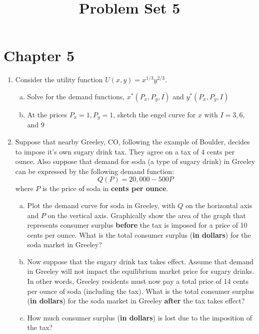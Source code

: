 \documentclass[11pt]{article}
\title{Problem Set 5}
\begin{document}
  
\section*{Chapter 5}

\begin{enumerate}
  \item Consider the utility function $U(x,y) = x^{1/3} y^{2/3}$. 
  
  \begin{enumerate}[(a)]
    \item Solve for the demand functions, $x^*(P_x, P_y, I)$ and $y^*(P_x, P_y, I)$
    


    \item At the prices $P_x = 1, P_y = 1$, sketch the engel curve for $x$ with $I = 3, 6,$ and $9$
    
  \end{enumerate}
  
  \newpage 
  \item Suppose that nearby Greeley, CO, following the example of Boulder, decides to impose it's own sugary drink tax. They agree on a tax of 4 cents per ounce. Also suppose that demand for soda (a type of sugary drink) in Greeley can be expressed by the following demand function:
  $$
    Q(P) = 20,000 - 500P
  $$
  where $P$ is the price of soda in \textbf{cents per ounce}.

  \begin{enumerate}[(a)]
    \item Plot the demand curve for soda in Greeley, with $Q$ on the horizontal axis and $P$ on the vertical axis. Graphically show the area of the graph that represents consumer surplus \textbf{before} the tax is imposed for a price of 10 cents per ounce. What is the total consumer surplus (\textbf{in dollars}) for the soda market in Greeley?
    
    
    \newpage
    \item Now suppose that the sugary drink tax takes effect. Assume that demand in Greeley will not impact the equilibrium market price for sugary drinks. In other words, Greeley residents must now pay a total price of 14 cents per ounce of soda (including the tax). What is the total consumer surplus (\textbf{in dollars}) for the soda market in Greeley \textbf{after} the tax takes effect?
    
    \vspace*{120mm}
    \item How much consumer surplus (\textbf{in dollars}) is lost due to the imposition of the tax?
  \end{enumerate}
  \newpage
\end{enumerate}
\end{document}
